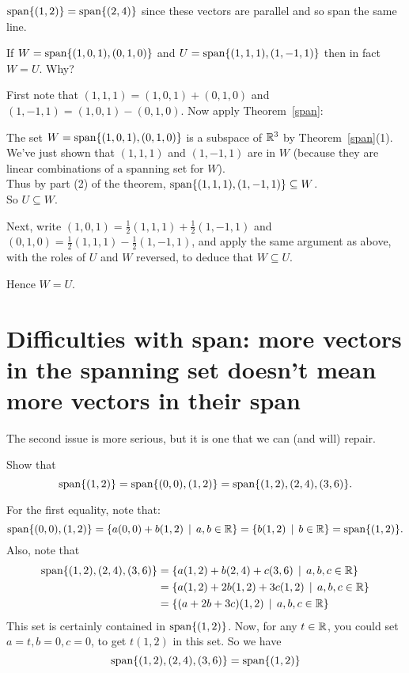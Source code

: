 \begin{myexample} $\textrm{span}\{ (1,2)\} = \textrm{span}\{(2,4)\}$ since these vectors are 
parallel and so span the same line. \end{myexample}

\begin{myexample} If $W = \textrm{span}\{ (1,0,1), (0,1,0)\}$ and $U = \textrm{span}\{ (1,1,1), (1,-1,1)\}$
then in fact $W=U$.  Why? 

First note that $(1,1,1) = (1,0,1)+ (0,1,0)$ and $(1,-1,1)=(1,0,1)-(0,1,0)$.
Now apply Theorem~\ref{span}:

The set $W = \textrm{span}\{ (1,0,1), (0,1,0)\}$
is a subspace of $\mathbb{R}^3$ by Theorem~\ref{span}(1).\\  
We've just shown that
$(1,1,1)$ and $(1,-1,1)$ are in $W$ (because they are linear combinations 
of a spanning set for $W$).\\
Thus by part (2) of the theorem, $\textrm{span}\{  (1,1,1), (1,-1,1)\} \subseteq W$.\\
So $U \subseteq W$.

Next, write $(1,0,1) = \frac12(1,1,1)+\frac12(1,-1,1)$ and
$(0,1,0) = \frac12(1,1,1)-\frac12(1,-1,1)$, and apply the same
argument as above, with the roles of $U$ and $W$ reversed, to
deduce that $W \subseteq U$.

Hence $W=U$.
\end{myexample}


\section[Difficulties with span, II]{Difficulties with span:  more vectors in the spanning set doesn't mean more vectors in their span}

The second issue is more serious, but it is one that we can (and will)
repair.

\begin{myprob} Show that
$$
\textrm{span}\{(1,2)\} = \textrm{span}\{ (0,0), (1,2) \} = \textrm{span}\{(1,2), (2,4), (3,6)\}.
$$

\begin{mysol} 
For the first equality, note that:
$$
\textrm{span}\{ (0,0), (1,2) \} = \{ a(0,0) + b(1,2) \,\mid \, a,b\in \mathbb{R}\} = \{  b(1,2) \,\mid \, b\in \mathbb{R}\} = \textrm{span}\{(1,2)\}.
$$
Also, note that
\begin{align*}
\textrm{span}\{(1,2), (2,4), (3,6)\} &= \{ a(1,2) + b(2,4) + c(3,6) \,\mid \, a,b,c\in\mathbb{R}\}\\
&= \{ a(1,2) + 2b(1,2) + 3c(1,2) \,\mid \, a,b,c\in \mathbb{R}\}\\
&= \{ (a+2b+3c)(1,2) \,\mid \,  a,b,c\in \mathbb{R}\}
\end{align*}
This set is certainly contained in $\textrm{span}\{(1,2)\}$.  
Now, for any $t\in \mathbb{R}$, you could set $a=t, b=0, c=0$, to get $t(1,2)$
in this set.  So we have
$$
\textrm{span}\{(1,2), (2,4), (3,6)\} = \textrm{span}\{(1,2)\}
$$
\end{mysol}\end{myprob}


